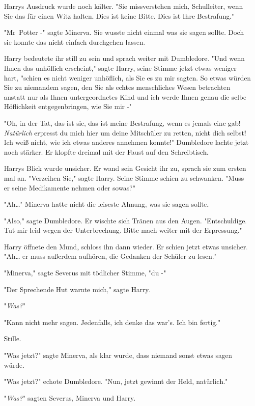 {Harrys Ausdruck wurde noch kälter. "Sie missverstehen mich, Schulleiter, wenn Sie das für einen Witz halten. Dies ist keine Bitte. Dies ist Ihre Bestrafung."

"Mr~Potter -" sagte Minerva. Sie wusste nicht einmal was sie sagen sollte. Doch sie konnte das nicht einfach durchgehen lassen.

Harry bedeutete ihr still zu sein und sprach weiter mit Dumbledore. "Und wenn Ihnen das unhöflich erscheint," sagte Harry, seine Stimme jetzt etwas weniger hart, "schien es nicht weniger unhöflich, als Sie es zu mir sagten. So etwas würden Sie zu niemandem sagen, den Sie als echtes menschliches Wesen betrachten anstatt nur als Ihnen untergeordnetes Kind und ich werde Ihnen genau die selbe Höflichkeit entgegenbringen, wie Sie mir -"

"Oh, in der Tat, das ist sie, das ist meine Bestrafung, wenn es jemals eine gab! \emph{Natürlich} erpresst du mich hier um deine Mitschüler zu retten, nicht dich selbst! Ich weiß nicht, wie ich etwas anderes annehmen konnte!" Dumbledore lachte jetzt noch stärker. Er klopfte dreimal mit der Faust auf den Schreibtisch.

Harrys Blick wurde unsicher. Er wand sein Gesicht ihr zu, sprach sie zum ersten mal an. "Verzeihen Sie," sagte Harry. Seine Stimme schien zu schwanken. "Muss er seine Medikamente nehmen oder sowas?"

"Ah…" Minerva hatte nicht die leiseste Ahnung, was sie sagen sollte.

"Also," sagte Dumbledore. Er wischte sich Tränen aus den Augen. "Entschuldige. Tut mir leid wegen der Unterbrechung. Bitte mach weiter mit der Erpressung."

Harry öffnete den Mund, schloss ihn dann wieder. Er schien jetzt etwas unsicher. "Ah… er muss außerdem aufhören, die Gedanken der Schüler zu lesen."

"Minerva," sagte Severus mit tödlicher Stimme, "du -"

"Der Sprechende Hut warnte mich," sagte Harry.

"\emph{Was?}"

"Kann nicht mehr sagen. Jedenfalls, ich denke das war's. Ich bin fertig."

Stille.

"Was jetzt?" sagte Minerva, als klar wurde, dass niemand sonst etwas sagen würde.

"Was jetzt?" echote Dumbledore. "Nun, jetzt gewinnt der Held, natürlich."

"\emph{Was?}" sagten Severus, Minerva und Harry.

}
